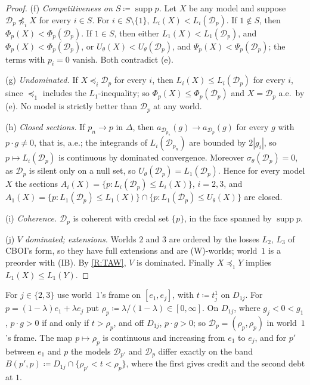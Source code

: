 \documentclass[11pt]{article}
\theoremstyle{definition}\newtheorem{definition}[theorem]{Definition}
\theoremstyle{remark}\newtheorem{remark}[theorem]{Remark}
\newcommand{\Dscr}{\mathcal D}
\newcommand{\supp}{\operatorname{supp}}
\begin{document}
\begin{proof}
(f) \emph{Competitiveness on $S\coloneqq\supp p$.} Let $X$ be any model and
suppose $\Dscr_p\not\preceq_iX$ for every $i\in S$. For $i\in S\setminus
\{1\}$, $L_i(X)<L_i(\Dscr_p)$. If $1\notin S$, then
$\Phi_p(X)<\Phi_p(\Dscr_p)$. If $1\in S$, then either
$L_1(X)<L_1(\Dscr_p)$, and $\Phi_p(X)<\Phi_p(\Dscr_p)$, or
$U_\theta(X)<U_\theta(\Dscr_p)$, and $\Psi_p(X)<\Psi_p(\Dscr_p)$; the terms
with $p_i=0$ vanish. Both contradict (e).

(g) \emph{Undominated.} If $X\preceq_i\Dscr_p$ for every $i$, then
$L_i(X)\le L_i(\Dscr_p)$ for every $i$, since $\preceq_1$ includes the
$L_1$-inequality; so $\Phi_p(X)\le\Phi_p(\Dscr_p)$ and $X=\Dscr_p$ a.e.\ by
(e). No model is strictly better than $\Dscr_p$ at any world.

(h) \emph{Closed sections.} If $p_n\to p$ in $\Delta$, then
$a_{\Dscr_{p_n}}(g)\to a_{\Dscr_p}(g)$ for every $g$ with $p\cdot g\ne0$,
that is, a.e.; the integrands of $L_i(\Dscr_{p_n})$ are bounded by
$2|g_i|$, so $p\mapsto L_i(\Dscr_p)$ is continuous by dominated
convergence. Moreover $\sigma_\theta(\Dscr_p)=0$, as $\Dscr_p$ is silent
only on a null set, so $U_\theta(\Dscr_p)=L_1(\Dscr_p)$. Hence for every
model $X$ the sections $A_i(X)=\{p:L_i(\Dscr_p)\le L_i(X)\}$, $i=2,3$, and
$A_1(X)=\{p:L_1(\Dscr_p)\le L_1(X)\}\cap\{p:L_1(\Dscr_p)\le U_\theta(X)\}$
are closed.

(i) \emph{Coherence.} $\Dscr_p$ is coherent with credal set $\{p\}$, in the
face spanned by $\supp p$.

(j) \emph{$V$ dominated; extensions.} Worlds $2$ and $3$ are ordered by the
losses $L_2$, $L_3$ of CBOI's form, so they have full extensions and are
(W)-worlds; world~$1$ is a preorder with (IB). By \ref{R:TAW}, $V$ is
dominated. Finally $X\preceq_1Y$ implies $L_1(X)\le L_1(Y)$.
\end{proof}

For $j\in\{2,3\}$ use world~$1$'s frame on $[e_1,e_j]$, with $t\coloneqq
t^1_j$ on $D_{1j}$. For $p=(1-\lambda)e_1+\lambda e_j$ put
$\rho_p\coloneqq\lambda/(1-\lambda)\in[0,\infty]$. On $D_{1j}$, where
$g_j<0<g_1$, $p\cdot g>0$ if and only if $t>\rho_p$, and off $D_{1j}$,
$p\cdot g>0$; so $\Dscr_p=(\rho_p,\rho_p)$ in world~$1$'s frame. The map
$p\mapsto\rho_p$ is continuous and increasing from $e_1$ to $e_j$, and for
$p'$ between $e_1$ and $p$ the models $\Dscr_{p'}$ and $\Dscr_p$ differ
exactly on the band $B(p',p)\coloneqq D_{1j}\cap\{\rho_{p'}<t<\rho_p\}$,
where the first gives credit and the second debt at $1$.
\end{document}
